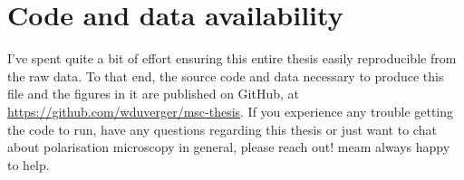 \chapter{Code and data availability}

I've spent quite a bit of effort ensuring this entire thesis easily reproducible from the raw data. To that end, the source code and data necessary to produce this file and the figures in it are published on GitHub, at \url{https://github.com/wduverger/msc-thesis}.
If you experience any trouble getting the code to run, have any questions regarding this thesis or just want to chat about polarisation microscopy in general, please reach out! meam always happy to help.